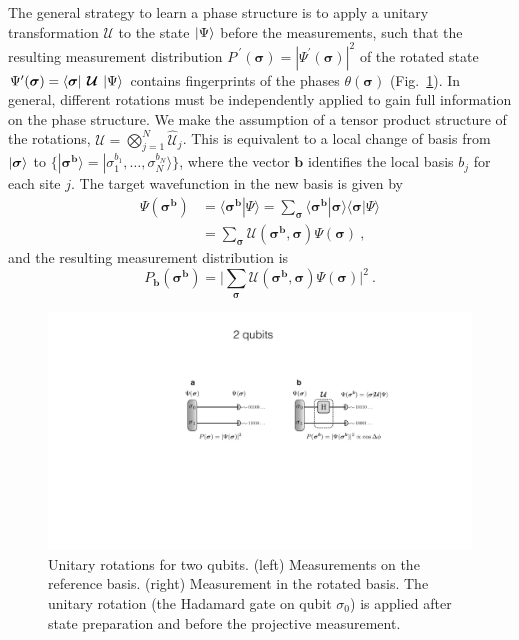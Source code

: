 \documentclass[submission, Phys, hidelnks]{SciPost}
\begin{document}
The general strategy to learn a phase structure is to apply a unitary
transformation $\bm{\mathcal{U}}$ to the state $\ket{\Psi}$ before the
measurements, such that the resulting measurement distribution
$P^{\:\prime}(\bm{\sigma})=|\Psi^\prime(\bm{\sigma})|^2$ of the rotated state
$\Psi^\prime(\bm{\sigma})=\bra{ \bm{\sigma} } \:\bm{\mathcal{U}}\:\ket{ \Psi}$
contains fingerprints of the phases $\theta(\bm{\sigma})$
(Fig.~\ref{phase_learn}). In general, different rotations must be independently
applied to gain full information on the phase structure. We make the assumption
of a tensor product structure of the rotations,
$\bm{\mathcal{U}}=\bigotimes_{j=1}^N\hat{\mathcal{U}}_j$. This is equivalent to
a local change of basis from $\ket{ \bm{\sigma}}$ to
$\lbrace|\bm{\sigma}^{\bm{b}}\rangle=|\sigma_1^{b_1},\dots,\sigma_N^{b_N}\rangle\rbrace$,
where the vector $\bm{b}$ identifies the local basis $b_j$ for each site $j$.
The target wavefunction in the new basis is given by
\begin{equation}
\begin{split}
    \Psi(\bm{\sigma}^{\bm{b}})
    &=\langle \bm{\sigma}^{\bm{b}}|\Psi\rangle=\sum_{\bm{\sigma}}\langle \bm{\sigma}^{\bm{b}}|\bm{\sigma}\rangle\langle\bm{\sigma}|\Psi\rangle\\
    &=\sum_{\bm{\sigma}}\bm{\mathcal{U}}(\bm{\sigma}^{\bm{b}},\bm{\sigma})\Psi(\bm{\sigma})\:,
\end{split}
\end{equation}
and the resulting measurement distribution is
\begin{equation}
    P_{\bm{b}}(\bm{\sigma}^{\bm{b}})=\bigg|\sum_{\bm{\sigma}}\bm{\mathcal{U}}(\bm{\sigma}^{\bm{b}},\bm{\sigma})\Psi(\bm{\sigma})\bigg|^2\:.
\end{equation}

\begin{figure}[htb]
    \centering
    \includegraphics[width=\columnwidth, trim={0 0 0 40}, clip]{2qubits_rotation}
    \caption{
        Unitary rotations for two qubits. (left) Measurements on the reference
        basis. (right) Measurement in the rotated basis. The unitary rotation
        (the Hadamard gate on qubit $\sigma_0$) is applied after state
        preparation and before the projective measurement.
    }\label{phase_learn}
\end{figure}
\end{document}
